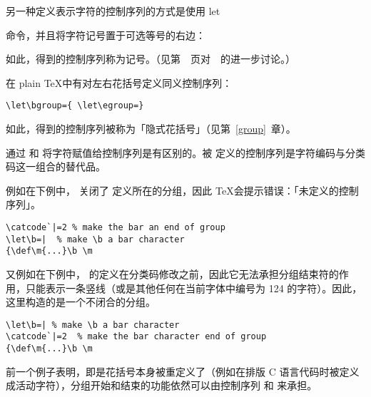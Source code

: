 \documentclass{book}
\begin{document}
另一种定义表示字符的控制序列的方式是使用  \cstoidx let\par 命令，并且将字符记号置于可选等号的右边：
\begin{disp}\end{disp}
如此，得到的控制序列称为记号。（见第~\pageref{let}~页对~~的进一步讨论。）

在 plain \TeX 中有对左右花括号定义同义控制序列：
\begin{verbatim}
\let\bgroup={ \let\egroup=}
\end{verbatim}
如此，得到的控制序列被称为「隐式花括号」（见第~\ref{group}~章）。

通过  和  将字符赋值给控制序列是有区别的。被  定义的控制序列是字符编码与分类码这一组合的替代品。

例如在下例中， 关闭了  定义所在的分组，因此 \TeX 会提示错误：「未定义的控制序列」。
\begin{verbatim}
\catcode`|=2 % make the bar an end of group
\let\b=|  % make \b a bar character
{\def\m{...}\b \m
\end{verbatim}
又例如在下例中， 的定义在分类码修改之前，因此它无法承担分组结束符的作用，只能表示一条竖线（或是其他任何在当前字体中编号为 124 的字符）。因此，这里构造的是一个不闭合的分组。
\begin{verbatim}
\let\b=| % make \b a bar character
\catcode`|=2  % make the bar character end of group
{\def\m{...}\b \m
\end{verbatim}
前一个例子表明，即是花括号本身被重定义了（例如在排版 C 语言代码时被定义成活动字符），分组开始和结束的功能依然可以由控制序列  和  来承担。
\end{document}
